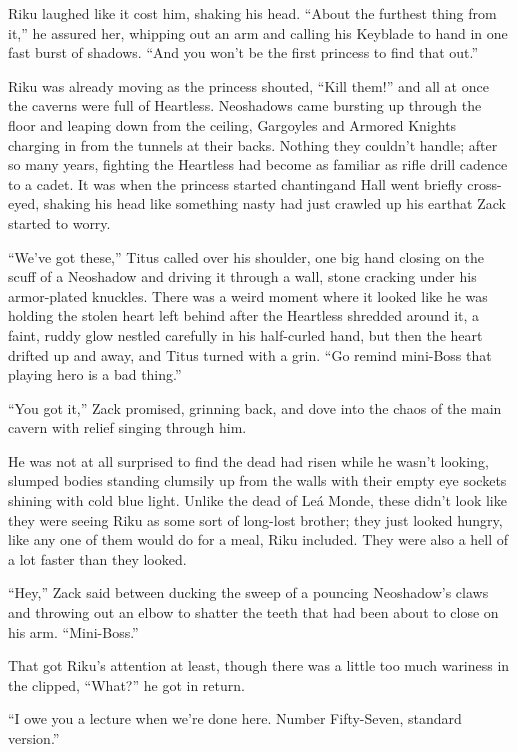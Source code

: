 Riku laughed like it cost him, shaking his head. ``About the furthest thing from it,'' he assured her, whipping out an arm and calling his Keyblade to hand in one fast burst of shadows. ``And you won't be the first princess to find that out.''

Riku was already moving as the princess shouted, ``Kill them!'' and all at once the caverns were full of Heartless. Neoshadows came bursting up through the floor and leaping down from the ceiling, Gargoyles and Armored Knights charging in from the tunnels at their backs. Nothing they couldn't handle; after so many years, fighting the Heartless had become as familiar as rifle drill cadence to a cadet. It was when the princess started chanting\textemdash and Hall went briefly cross-eyed, shaking his head like something nasty had just crawled up his ear\textemdash that Zack started to worry.

``We've got these,'' Titus called over his shoulder, one big hand closing on the scuff of a Neoshadow and driving it through a wall, stone cracking under his armor-plated knuckles. There was a weird moment where it looked like he was holding the stolen heart left behind after the Heartless shredded around it, a faint, ruddy glow nestled carefully in his half-curled hand, but then the heart drifted up and away, and Titus turned with a grin. ``Go remind mini-Boss that playing hero is a bad thing.''

``You got it,'' Zack promised, grinning back, and dove into the chaos of the main cavern with relief singing through him.

He was not at all surprised to find the dead had risen while he wasn't looking, slumped bodies standing clumsily up from the walls with their empty eye sockets shining with cold blue light. Unlike the dead of Leá Monde, these didn't look like they were seeing Riku as some sort of long-lost brother; they just looked hungry, like any one of them would do for a meal, Riku included. They were also a hell of a lot faster than they looked.

``Hey,'' Zack said between ducking the sweep of a pouncing Neoshadow's claws and throwing out an elbow to shatter the teeth that had been about to close on his arm. ``Mini-Boss.''

That got Riku's attention at least, though there was a little too much wariness in the clipped, ``What?'' he got in return.

``I owe you a lecture when we're done here. Number Fifty-Seven, standard version.''

